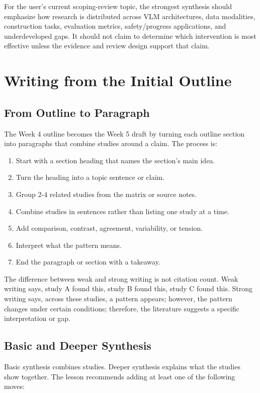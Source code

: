 \documentclass[10pt,letterpaper]{article}
\begin{document}
For the user's current scoping-review topic, the strongest synthesis should emphasize how research is distributed across VLM architectures, data modalities, construction tasks, evaluation metrics, safety/progress applications, and underdeveloped gaps. It should not claim to determine which intervention is most effective unless the evidence and review design support that claim.

\section{Writing from the Initial Outline}

\subsection{From Outline to Paragraph}

The Week 4 outline becomes the Week 5 draft by turning each outline section into paragraphs that combine studies around a claim. The process is:

\begin{enumerate}
\item Start with a section heading that names the section's main idea.
\item Turn the heading into a topic sentence or claim.
\item Group 2-4 related studies from the matrix or source notes.
\item Combine studies in sentences rather than listing one study at a time.
\item Add comparison, contrast, agreement, variability, or tension.
\item Interpret what the pattern means.
\item End the paragraph or section with a takeaway.
\end{enumerate}

The difference between weak and strong writing is not citation count. Weak writing says, study A found this, study B found this, study C found this. Strong writing says, across these studies, a pattern appears; however, the pattern changes under certain conditions; therefore, the literature suggests a specific interpretation or gap.

\subsection{Basic and Deeper Synthesis}

Basic synthesis combines studies. Deeper synthesis explains what the studies show together. The lesson recommends adding at least one of the following moves:
\end{document}
